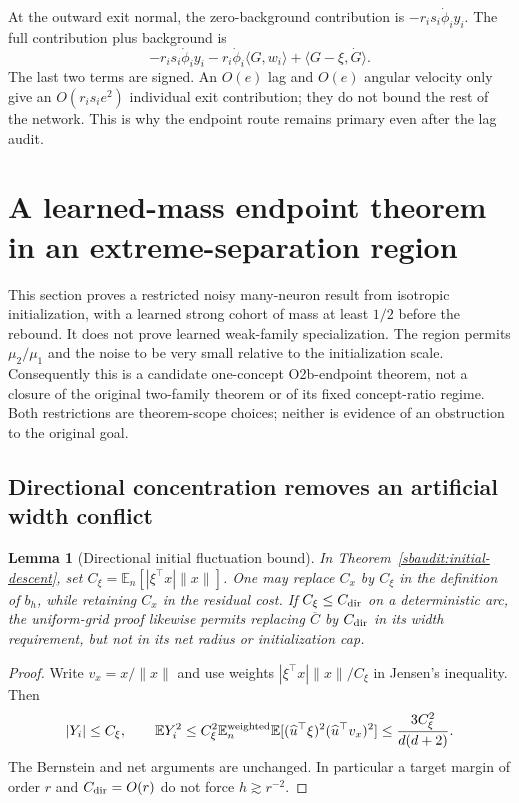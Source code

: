 \documentclass[11pt]{article}
\newtheorem{lemma}[theorem]{Lemma}
\theoremstyle{remark}
\begin{document}
At the outward exit normal, the zero-background contribution is
$-r_is_i\dot\phi_i y_i$. The full contribution plus background is
\[
 -r_is_i\dot\phi_i y_i
 -r_i\dot\phi_i\langle G,w_i\rangle
 +\langle G-\xi,\dot G\rangle.
\]
The last two terms are signed. An $O(e)$ lag and $O(e)$ angular velocity
only give an $O(r_is_i e^2)$ individual exit contribution; they do not
bound the rest of the network. This is why the endpoint route remains
primary even after the lag audit.

\section{A learned-mass endpoint theorem in an extreme-separation region}
\label{sbsep:scope}

This section proves a restricted noisy many-neuron result from isotropic
initialization, with a learned strong cohort of mass at least $1/2$ before
the rebound. It does not prove learned weak-family specialization. The
region permits $\mu_2/\mu_1$ and the noise to be very small relative to the
initialization scale. Consequently this is a candidate one-concept
O2b-endpoint theorem, not a closure of the original two-family theorem or
of its fixed concept-ratio regime. Both restrictions are theorem-scope
choices; neither is evidence of an obstruction to the original goal.

\subsection{Directional concentration removes an artificial width conflict}

\begin{lemma}[Directional initial fluctuation bound]
\label{sbsep:directional-variance}
In Theorem~\ref{sbaudit:initial-descent}, set
$C_\xi=\mathbb E_n[|\xi^\top x|\|x\|]$. One may replace $C_x$ by
$C_\xi$ in the definition of $b_h$, while retaining $C_x$ in the residual
cost. If $C_\xi\le C_{\rm dir}$ on a deterministic arc, the uniform-grid
proof likewise permits replacing $\overline C$ by $C_{\rm dir}$ in its
width requirement, but not in its net radius or initialization cap.
\end{lemma}
\begin{proof}
Write $v_x=x/\|x\|$ and use weights
$|\xi^\top x|\|x\|/C_\xi$ in Jensen's inequality. Then
\[
 |Y_i|\le C_\xi,\qquad
 \mathbb EY_i^2\le C_\xi^2\mathbb E_n^{\rm weighted}
 \mathbb E[(\widehat u^\top\xi)^2(\widehat u^\top v_x)^2]
 \le\frac{3C_\xi^2}{d(d+2)}.
\]
The Bernstein and net arguments are unchanged. In particular a target
margin of order $r$ and $C_{\rm dir}=O(r)$ do not force $h\gtrsim r^{-2}$.
\end{proof}
\end{document}
